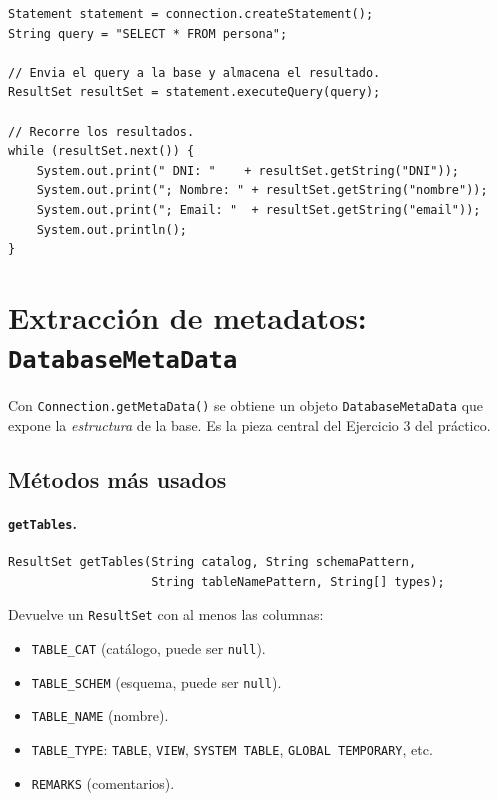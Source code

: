 \documentclass[11pt,a4paper]{article}
\begin{document}
\begin{lstlisting}
Statement statement = connection.createStatement();
String query = "SELECT * FROM persona";

// Envia el query a la base y almacena el resultado.
ResultSet resultSet = statement.executeQuery(query);

// Recorre los resultados.
while (resultSet.next()) {
    System.out.print(" DNI: "    + resultSet.getString("DNI"));
    System.out.print("; Nombre: " + resultSet.getString("nombre"));
    System.out.print("; Email: "  + resultSet.getString("email"));
    System.out.println();
}
\end{lstlisting}

\section{Extracción de metadatos: \texttt{DatabaseMetaData}}

Con \texttt{Connection.getMetaData()} se obtiene un objeto
\texttt{DatabaseMetaData} que expone la \emph{estructura} de la base.
Es la pieza central del Ejercicio 3 del práctico.

\subsection*{Métodos más usados}

\paragraph{\texttt{getTables}.}

\begin{lstlisting}
ResultSet getTables(String catalog, String schemaPattern,
                    String tableNamePattern, String[] types);
\end{lstlisting}

Devuelve un \texttt{ResultSet} con al menos las columnas:

\begin{itemize}
    \item \texttt{TABLE\_CAT} (catálogo, puede ser \texttt{null}).
    \item \texttt{TABLE\_SCHEM} (esquema, puede ser \texttt{null}).
    \item \texttt{TABLE\_NAME} (nombre).
    \item \texttt{TABLE\_TYPE}: \texttt{TABLE}, \texttt{VIEW},
    \texttt{SYSTEM TABLE}, \texttt{GLOBAL TEMPORARY}, etc.
    \item \texttt{REMARKS} (comentarios).
\end{itemize}
\end{document}
